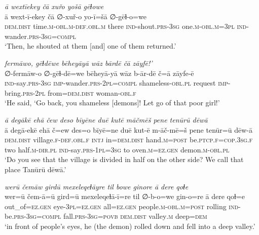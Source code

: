 \ea \label{ZP.68}
\textit{ā wextīekey čā xuřo yošā gēɫowe} \\ 
\gll ā wext-ī-ekey čā ∅-xuř-o yo-ī=šā ∅-gēɫ-o=we \\ 
 \textsc{dem.dist} time\textsc{.m}\textsc{-obl}\textsc{.m}\textsc{-def}\textsc{.obl}\textsc{.m} there \textsc{ind-}shout\textsc{.prs}\textsc{-3sg} one\textsc{.m}\textsc{-obl}\textsc{.m}\textsc{=3pl} \textsc{ind-}wander\textsc{.prs}\textsc{-3sg}\textsc{=compl} \\ 
\glt `Then, he shouted at them [and] one of them returned.'
\z 
 
\ea \label{ZP.70}
\textit{fermāwo, gēɫdēwe bēheyāyā wāz bārdē čā zāyfē!’} \\ 
\gll ∅-fermāw-o ∅-gēɫ-dē=we bēheyā-yā wāz b-ār-dē č=ā zāyfe-ē \\ 
 \textsc{ind-}say\textsc{.prs}\textsc{-3sg} \textsc{imp-}wander\textsc{.prs}-\textsc{2pl}\textsc{=compl} shameless\textsc{-obl}\textsc{.pl} request \textsc{imp-}bring\textsc{.prs}-\textsc{2pl} from=\textsc{dem.dist} woman\textsc{-obl}\textsc{.f} \\ 
\glt `He said, ‘Go back, you shameless [demons]! Let go of that poor girl!'
\z 
 
\ea \label{ZP.74}
\textit{ā degākē ehā čew deso bīyēne duē kutē māčmēš pene tenūrū dēwā} \\ 
\gll ā degā-ekē ehā č=ew des=o bīyē=ne duē kut-ē m-āč-mē=š pene tenūr=ū dēw-ā \\ 
 \textsc{dem.dist} village\textsc{.f}\textsc{-def}\textsc{.obl}\textsc{.f} \textsc{intj} in=\textsc{dem.dist} hand\textsc{.m}\textsc{=\textsc{post}} be\textsc{.ptcp}\textsc{.f}\textsc{=cop}\textsc{.3sg}\textsc{.f} two half\textsc{.m}\textsc{-dir}\textsc{.pl} \textsc{ind-}say\textsc{.prs}\textsc{-1pl}\textsc{=3sg} to oven\textsc{.m}\textsc{\textsc{=ez.gen}} demon\textsc{.m}\textsc{-obl}\textsc{.pl} \\ 
\glt `Do you see that the village is divided in half on the other side? We call that place Tanūrū dēwā.'
\z 
 
\ea \label{ZP.80}
\textit{werū čemāw girdū mexeleqeɫāyre til bowe ginore ā dere qoɫe} \\ 
\gll wer=ū čem-ā=ū gird=ū mexeleqeɫā-ī=re til ∅-b-o=we gin-o=re ā dere qoɫ=e \\ 
 out\_of\textsc{\textsc{=ez.gen}} eye\textsc{-3pl}\textsc{\textsc{=ez.gen}} all\textsc{\textsc{=ez.gen}} people\textsc{.m}\textsc{-obl}\textsc{.m}\textsc{=\textsc{post}} rolling \textsc{ind-}be\textsc{.prs}\textsc{-3sg}\textsc{=compl} fall\textsc{.prs}\textsc{-3sg}\textsc{=\textsc{povb}} \textsc{dem.dist} valley\textsc{.m} deep\textsc{=dem} \\ 
\glt `in front of people’s eyes, he (the demon) rolled down and fell into a deep valley.'
\z 
 
